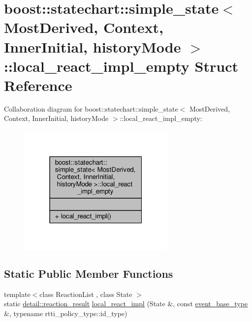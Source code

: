 \hypertarget{structboost_1_1statechart_1_1simple__state_1_1local__react__impl__empty}{}\section{boost\+:\+:statechart\+:\+:simple\+\_\+state$<$ Most\+Derived, Context, Inner\+Initial, history\+Mode $>$\+:\+:local\+\_\+react\+\_\+impl\+\_\+empty Struct Reference}
\label{structboost_1_1statechart_1_1simple__state_1_1local__react__impl__empty}


Collaboration diagram for boost\+:\+:statechart\+:\+:simple\+\_\+state$<$ Most\+Derived, Context, Inner\+Initial, history\+Mode $>$\+:\+:local\+\_\+react\+\_\+impl\+\_\+empty\+:
\nopagebreak
\begin{figure}[H]
\begin{center}
\leavevmode
\includegraphics[width=220pt]{structboost_1_1statechart_1_1simple__state_1_1local__react__impl__empty__coll__graph}
\end{center}
\end{figure}
\subsection*{Static Public Member Functions}
\begin{DoxyCompactItemize}
\item 
{\footnotesize template$<$class Reaction\+List , class State $>$ }\\static \mbox{\hyperlink{namespaceboost_1_1statechart_1_1detail_ab091bbb4c29327fb46ee479ea1b7255b}{detail\+::reaction\+\_\+result}} \mbox{\hyperlink{structboost_1_1statechart_1_1simple__state_1_1local__react__impl__empty_a4c956ba72122a657e27391a6d49832b9}{local\+\_\+react\+\_\+impl}} (State \&, const \mbox{\hyperlink{classboost_1_1statechart_1_1simple__state_a153e115715f5d828021a273ce282ba9b}{event\+\_\+base\+\_\+type}} \&, typename rtti\+\_\+policy\+\_\+type\+::id\+\_\+type)
\end{DoxyCompactItemize}


